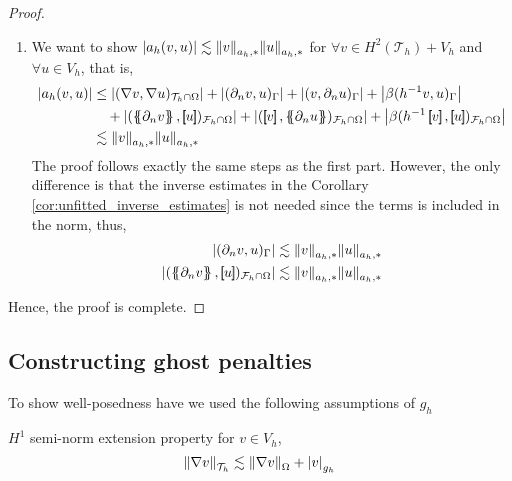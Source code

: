 \begin{proof}
\begin{enumerate}[label=\arabic*)]
\item We want to show $\left\lvert  a_{h}( v,u)  \right\rvert  \lesssim \| v \|_{ a_{h},* }^{  }  \| u \|_{ a_{h},* }^{  }$
for $ \forall v \in  H^{2}( \mathcal{T}_{h} ) + V_{h} $ and $ \forall u \in V_{h}$,
    that is,      \[
        \begin{split}
    \left\lvert a_{h}( v,u)  \right\rvert & \le  \left\lvert( \nabla v, \nabla u)_{\mathcal{T} _{h} \cap \Omega }  \right\rvert +  \left\lvert  ( \partial _{n} v,u)_{\Gamma } \right\rvert   + \left\lvert ( v, \partial _{n} u)_{\Gamma } \right\rvert  +
    \left\lvert\beta ( h^{-1} v,u)_{\Gamma }  \right\rvert  \\
    & \quad  + \left\lvert( \mean{ \partial _{n} v }  , \jump{ u }  ) _{\mathcal{F} _{h} \cap \Omega }  \right\rvert  + \left\lvert ( \jump{ v }  , \mean{ \partial _{n} u }  )_{\mathcal{F} _{h}\cap \Omega } \right\rvert  + \left\lvert \beta ( h^{-1} \jump{ v }  ,
    \jump{ u }  )_{\mathcal{F}_{h}\cap \Omega  } \right\rvert \\
     & \lesssim  \| v \|_{ a_{h},* }^{  }  \| u \|_{ a_{h},* }^{  }
        \end{split}
    \]
    The proof follows exactly the same steps as the first part. However, the only difference is that the inverse estimates in the Corollary \ref{cor:unfitted_inverse_estimates} is not needed since the terms is included in the norm, thus, \[
        \begin{split}
    \abs{ ( \partial _{n} v, u) _{\Gamma } } & \lesssim \| v \|_{ a_{h},* }^{  } \| u \|_{a_{h},*  }^{  } \\
    \abs{ ( \mean{ \partial _{n} v  }  , \jump{ u }  ) _{\mathcal{F} _{h} \cap \Omega  } } & \lesssim \| v \|_{ a_{h},* }^{  } \| u \|_{a_{h},*  }^{  }
        \end{split}
    \]

    \end{enumerate}

    Hence, the proof is complete.


\end{proof}


\subsection{Constructing ghost penalties}%
\label{sub:constructing_ghost_penalties}



To show well-posedness have we used the following assumptions of $g_{h}$

\begin{assumption}[EP1]
    \label{as:EP1_2}
    $H^{1}$ semi-norm extension property for $v \in  V_{h}$,  \[
    \| \nabla v \|_{ \mathcal{T} _{h} }^{  }  \lesssim \| \nabla v \|_{ \Omega  }^{  }  + \left\lvert  v  \right\rvert _{g_{h}}
    \]
\end{assumption}

